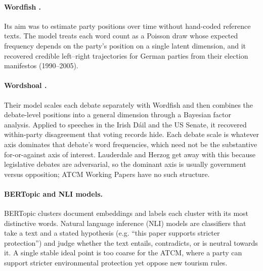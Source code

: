 \paragraph{Wordfish \parencite{Slapin2008}.}
Its aim was to estimate party positions over time without hand-coded reference texts. The model
treats each word count as a Poisson draw whose expected frequency depends on the party's position
on a single latent dimension, and it recovered credible left--right trajectories for German
parties from their election manifestos (1990--2005).

\paragraph{Wordshoal \parencite{Lauderdale2016}.}
Their model scales each debate separately with Wordfish and then combines the debate-level
positions into a general dimension through a Bayesian factor analysis. Applied to speeches in the
Irish D\'ail and the US Senate, it recovered within-party disagreement that voting records hide.
Each debate scale is whatever axis dominates that debate's word frequencies, which need not be
the substantive for-or-against axis of interest. Lauderdale and Herzog get away with this because
legislative debates are adversarial, so the dominant axis is usually government versus
opposition; ATCM Working Papers have no such structure.

\paragraph{BERTopic and NLI models.}
BERTopic \parencite{Grootendorst_BERTopic} clusters document embeddings and labels each cluster
with its most distinctive words. Natural language inference (NLI) models
\parencite{Burnham2023,Abercrombie2022} are classifiers that take a text and a stated hypothesis
(e.g. ``this paper supports stricter protection'') and judge whether the text entails,
contradicts, or is neutral towards it. A single stable ideal point is too coarse for the ATCM,
where a party can support stricter environmental protection yet oppose new tourism rules.

